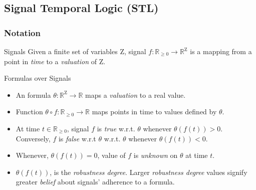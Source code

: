 \documentclass{beamer}
\newcommand{\typeTime}{\mathbb{R}_{\geq 0}}
\newcommand{\typeReal}{\mathbb{R}}
\newcommand{\Z}{\text{Z}}
\begin{document}
\subsection{Signal Temporal Logic (STL)}
\frametitle{Notation}
\begin{frame}
    \begin{block}{Signals}
        Given a finite set of variables $\Z$, signal
        $f : \typeTime \to \typeReal^{\Z}$ is a mapping
        from a point in \textit{time} to a \textit{valuation} of $\Z$.
    \end{block}
    \pause
    \begin{block}{Formulas over Signals}
        \begin{itemize}
            \item An formula $\theta : \typeReal^{\Z} \to \typeReal$
                  maps a \textit{valuation} to a real value.
            \item Function $\theta \circ f : \typeTime \to \typeReal$
                  maps points in time to values defined by $\theta$.
            \item At time $t \in \typeTime$, signal $f$ is \textit{true}
                w.r.t. $\theta$ whenever $\theta(f(t)) > 0 $.
                Conversely, $f$ is \textit{false} w.r.t $\theta$
                w.r.t. $\theta$ whenever $\theta(f(t)) < 0 $.
            \item Whenever, $\theta(f (t)) = 0$, value of $f$
                is \textit{unknown} on $\theta$ at time $t$.
            \item $\theta(f(t))$, is the \textit{robustness degree}.
                Larger \textit{robustness degree} values signify
                greater \textit{belief} about signals' adherence
                to a formula.
        \end{itemize}
    \end{block}
\end{frame}
\end{document}
